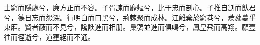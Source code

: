 
\begin{pinyinscope}
士窮而隱處兮，廉方正而不容。子胥諫而靡軀兮，比干忠而剖心。子推自割而飤君兮，德日忘而怨深。行明白而曰黑兮，荊棘聚而成林。江離棄於窮巷兮，蒺藜蔓乎東廂。賢者蔽而不見兮，讒諛進而相朋。梟鴞並進而俱鳴兮，鳳皇飛而高翔。願壹往而徑逝兮，道壅絕而不通。


\end{pinyinscope}